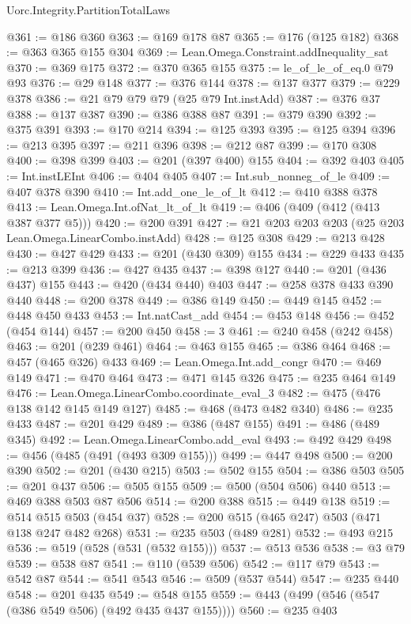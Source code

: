 \begin{lexlean}{Uorc.Integrity.PartitionTotalLaws}
\begin{coremodule}
@361 := @186 @360
@363 := @169 @178 @87
@365 := @176 (@125 @182)
@368 := @363 @365 @155 @304
@369 := Lean.Omega.Constraint.addInequality_sat
@370 := @369 @175
@372 := @370 @365 @155
@375 := le_of_le_of_eq.{0} @79 @93
@376 := @29 @148
@377 := @376 @144
@378 := @137 @377
@379 := @229 @378
@386 := @21 @79 @79 @79 (@25 @79 Int.instAdd)
@387 := @376 @37
@388 := @137 @387
@390 := @386 @388 @87
@391 := @379 @390
@392 := @375 @391
@393 := @170 @214
@394 := @125 @393
@395 := @125 @394
@396 := @213 @395
@397 := @211 @396
@398 := @212 @87
@399 := @170 @308
@400 := @398 @399
@403 := @201 (@397 @400) @155
@404 := @392 @403
@405 := Int.instLEInt
@406 := @404 @405
@407 := Int.sub_nonneg_of_le
@409 := @407 @378 @390
@410 := Int.add_one_le_of_lt
@412 := @410 @388 @378
@413 := Lean.Omega.Int.ofNat_lt_of_lt
@419 := @406 (@409 (@412 (@413 @387 @377 @5)))
@420 := @200 @391
@427 := @21 @203 @203 @203 (@25 @203 Lean.Omega.LinearCombo.instAdd)
@428 := @125 @308
@429 := @213 @428
@430 := @427 @429
@433 := @201 (@430 @309) @155
@434 := @229 @433
@435 := @213 @399
@436 := @427 @435
@437 := @398 @127
@440 := @201 (@436 @437) @155
@443 := @420 (@434 @440) @403
@447 := @258 @378 @433 @390 @440
@448 := @200 @378
@449 := @386 @149
@450 := @449 @145
@452 := @448 @450 @433
@453 := Int.natCast_add
@454 := @453 @148
@456 := @452 (@454 @144)
@457 := @200 @450
@458 := 3
@461 := @240 @458 (@242 @458)
@463 := @201 (@239 @461)
@464 := @463 @155
@465 := @386 @464
@468 := @457 (@465 @326) @433
@469 := Lean.Omega.Int.add_congr
@470 := @469 @149
@471 := @470 @464
@473 := @471 @145 @326
@475 := @235 @464 @149
@476 := Lean.Omega.LinearCombo.coordinate_eval_3
@482 := @475 (@476 @138 @142 @145 @149 @127)
@485 := @468 (@473 @482 @340)
@486 := @235 @433
@487 := @201 @429
@489 := @386 (@487 @155)
@491 := @486 (@489 @345)
@492 := Lean.Omega.LinearCombo.add_eval
@493 := @492 @429
@498 := @456 (@485 (@491 (@493 @309 @155)))
@499 := @447 @498
@500 := @200 @390
@502 := @201 (@430 @215)
@503 := @502 @155
@504 := @386 @503
@505 := @201 @437
@506 := @505 @155
@509 := @500 (@504 @506) @440
@513 := @469 @388 @503 @87 @506
@514 := @200 @388
@515 := @449 @138
@519 := @514 @515 @503 (@454 @37)
@528 := @200 @515 (@465 @247) @503 (@471 @138 @247 @482 @268)
@531 := @235 @503 (@489 @281)
@532 := @493 @215
@536 := @519 (@528 (@531 (@532 @155)))
@537 := @513 @536
@538 := @3 @79
@539 := @538 @87
@541 := @110 (@539 @506)
@542 := @117 @79
@543 := @542 @87
@544 := @541 @543
@546 := @509 (@537 @544)
@547 := @235 @440
@548 := @201 @435
@549 := @548 @155
@559 := @443 (@499 (@546 (@547 (@386 @549 @506) (@492 @435 @437 @155))))
@560 := @235 @403

\end{coremodule}
\end{lexlean}
